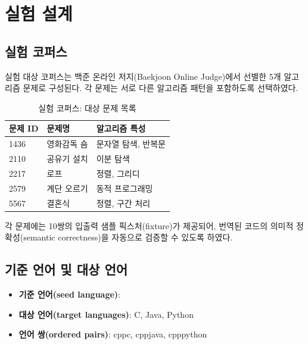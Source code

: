 \section{실험 설계}\label{sec:design}

\subsection{실험 코퍼스}\label{ssec:corpus}

실험 대상 코퍼스는 백준 온라인 저지(Baekjoon Online Judge)에서 선별한 5개 알고리즘
문제로 구성된다. 각 문제는 서로 다른 알고리즘 패턴을 포함하도록 선택하였다.

\begin{table}[htbp]
  \centering
  \caption{실험 코퍼스: 대상 문제 목록}\label{tab:corpus}
  \begin{tabular}{@{}lll@{}}
    \toprule
    문제 ID     & 문제명      & 알고리즘 특성        \\
    \midrule
   	1436  & 영화감독 숌 & 문자열 탐색, 반복문   \\
    2110  & 공유기 설치 & 이분 탐색            \\
    2217  & 로프        & 정렬, 그리디          \\
    2579  & 계단 오르기 & 동적 프로그래밍       \\
    5567  & 결혼식      & 정렬, 구간 처리       \\
    \bottomrule
  \end{tabular}
\end{table}

각 문제에는 10쌍의 입출력 샘플 픽스처(fixture)가 제공되어, 번역된 코드의 의미적 정확성(semantic correctness)을 자동으로 검증할 수 있도록 하였다.

\subsection{기준 언어 및 대상 언어}\label{ssec:languages}

\begin{itemize}[leftmargin=2em]
  \item \textbf{기준 언어(seed language)}: \cpp{}
  \item \textbf{대상 언어(target languages)}: C, Java, Python
  \item \textbf{언어 쌍(ordered pairs)}:
    \textsf{cpp\rarr{}c}, \textsf{cpp\rarr{}java}, \textsf{cpp\rarr{}python}
\end{itemize}

